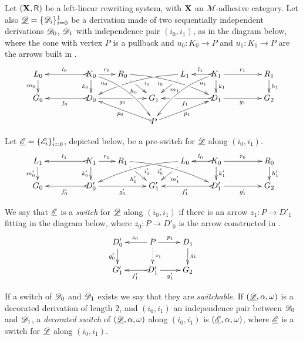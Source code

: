 \begin{definition}[Switch] 	Let $(\textbf {\textup{X}}, \mathsf{R})$ be a left-linear rewriting system, with $\textbf {\textup{X}}$ an $\mathcal{M}$-adhesive category.
	Let also $\underline{\mathscr{D}}=\{\mathscr{D}_i\}_{i=0}^1$ be a derivation made
	of two sequentially independent derivations $\mathscr{D}_0$,
	$\mathscr{D}_1$ with independence pair $(i_0, i_1)$, as in the diagram below, where the cone with vertex $P$ is a pullback and $u_0\colon K_0\to P$ and $u_1\colon K_1\to P$ are the arrows built in .
	\[\xymatrix@R=15pt@C=20pt{L_0 \ar[d]_{m_0}&& K_0 \ar @/^.35cm/[ddrr]_(.2){u_0}
		\ar[d]_{k_0}\ar@{>->}[ll]_{l_0} \ar[r]^{r_0} & R_0
		\ar@{>}@/^.25cm/[drrr]|(.32)\hole_(.4){i_0}|(.68)\hole
		\ar[dr]|(.33)\hole_{h_0} && L_1 \ar@{>}@/_.25cm/[dlll]^(.4){i_1}|(.68)\hole 
		\ar[dl]|(.33)\hole^{m_1}& K_1 \ar[d]^{k_1}\ar@{>->}[l]_{l_1} \ar @/_.35cm/[ddll]^(.2){u_1}
		\ar[rr]^{r_1} && R_1 \ar[d]^{h_1}\\G_0 && \ar@{>->}[ll]^{f_0}
		D_0 \ar[rr]_{g_0}|(.7)\hole&& G_1 && \ar@{>->}[ll]^{f_1}|(.7)\hole D_1
		\ar[rr]_{g_1}&& G_2 \\ & & & & P \ar[urr]_{p_1} \ar@{>->}[ull]^{p_0}}
	\]
	
	Let $\underline{\mathscr{E}}=\{\mathscr{E}_i\}_{i=0}^1$, depicted below, be a pre-switch for $\underline{\mathscr{D}}$ along $(i_0,i_1)$.
	\[
	\xymatrix@R=15pt@C=20pt{
		{L_1} \ar[d]_{m_0'}
		&&  {K_1} \ar@{>->}[ll]_{l_1} \ar[r]^{r_1} \ar[d]_{k_0'}
		&  {R_1} \ar[dr]|(.33)\hole_{h_0'}  \ar@/^.25cm/@{>}_(.4){i_0'}|(.32)\hole[drrr]
		& & 
		{L_0}\ar[dl]|(.33)\hole^{m_1'} \ar@/_.25cm/@{>}^(.4){i_1'}[dlll] 
		&  {K_0} \ar@{>->}[l]_{l_0} \ar[rr]^{r_0} \ar[d]^{k_1'}
		& & {R_0} \ar[d]^{h_1'} \\		
		{G_0}
		& & {D_0'} \ar@{>->}[ll]^{f_0'} \ar[rr]_{g_0'}
		& &  {G'_1} 
		& &  {D_1'} \ar@{>->}[ll]^{f_1'} \ar[rr]_{g_1'}
		& & {G_2}  }
	\]
	
	We say that $\underline{\mathscr{E}}$ is a \emph{switch} for $\underline{\mathscr{D}}$ along $(i_0, i_1)$ if there is an arrow $z_1\colon P\to D'_1$ fitting in the diagram below, where $z_0\colon P\to D'_0$ is the arrow constructed in .
	\[\xymatrix@R=18pt{D'_0  \ar[d]_{g'_0}& P \ar[r]^{p_1} \ar[l]_{z_0} \ar@{.>}[d]^{z_1} & D_1 \ar[d]^{g_1}\\ G'_1 & D'_1 \ar[r]_{g'_1} \ar@{>->}[l]^{f'_1} & G_2}\]
	
	If a switch of $\mathscr{D}_0$ and $\mathscr{D}_1$ exists we say that they are \emph{switchable}. If $(\underline{\mathscr{D}}, \alpha, \omega)$ is a decorated derivation of length $2$, and $(i_0, i_1)$ an independence pair between $\mathscr{D}_0$ and $\mathscr{D}_1$, a \emph{decorated switch} of $(\underline{\mathscr{D}}, \alpha, \omega)$ along $(i_0, i_1)$ is $(\underline{\mathscr{E}}, \alpha, \omega)$, where $\underline{\mathscr{E}}$ is a switch for $\underline{\mathscr{D}}$ along $(i_0, i_1)$.
\end{definition}

